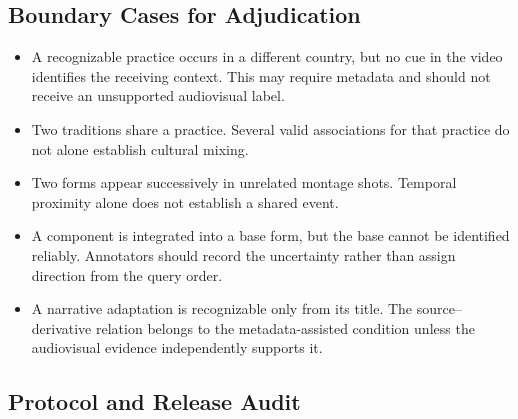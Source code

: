 \subsection{Boundary Cases for Adjudication}
\label{sec:boundary-cases}
\begin{itemize}
    \item A recognizable practice occurs in a different country, but no
    cue in the video identifies the receiving context. This may require
    metadata and should not receive an unsupported audiovisual label.
    \item Two traditions share a practice. Several valid associations
    for that practice do not alone establish cultural mixing.
    \item Two forms appear successively in unrelated montage shots.
    Temporal proximity alone does not establish a shared event.
    \item A component is integrated into a base form, but the base cannot
    be identified reliably. Annotators should record the uncertainty
    rather than assign direction from the query order.
    \item A narrative adaptation is recognizable only from its title.
    The source--derivative relation belongs to the metadata-assisted
    condition unless the audiovisual evidence independently supports it.
\end{itemize}

\subsection{Protocol and Release Audit}
\label{sec:release-audit}
